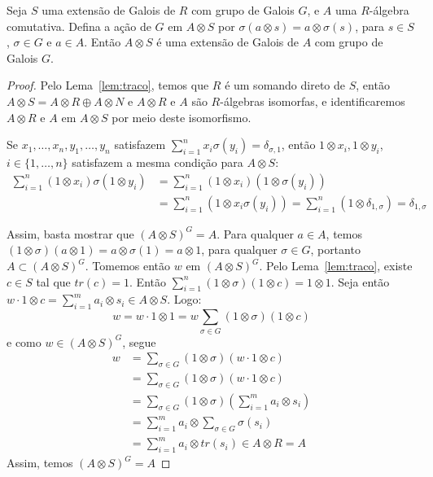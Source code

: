\begin{lemma} \label{lem:alg}
Seja $S$ uma extensão de Galois de $R$ com grupo de Galois $G$, e $A$ uma $R$-álgebra comutativa. Defina a ação de $G$ em $A \otimes S$ por $\sigma(a\otimes s) = a\otimes \sigma(s)$, para $s \in S$, $\sigma \in G$ e $a \in A$. Então $A \otimes S$ é uma extensão de Galois de $A$ com grupo de Galois $G$.
\begin{proof}
Pelo Lema~\ref{lem:traco}, temos que $R$ é um somando direto de $S$, então $A\otimes S= A\otimes R \oplus A\otimes N$ e $A\otimes R$ e $A$ são $R$-álgebras isomorfas, e identificaremos $A\otimes R$ e $A$ em $A\otimes S$ por meio deste isomorfismo. \par Se $x_1, \dots, x_n, y_1, \dots, y_n$ satisfazem $\sum_{i=1}^{n}x_i\sigma(y_i) = \delta_{\sigma,1}$, então $1\otimes x_i, 1\otimes y_i$, $i\in \{1,\dots, n\}$ satisfazem a mesma condição para $A\otimes S$:
\begin{align*}
        \sum_{i=1}^{n}(1\otimes x_i)\sigma(1\otimes y_i) &= \sum_{i=1}^{n}(1\otimes x_i)\left(1\otimes \sigma(y_i)\right) \\
        &= \sum_{i=1}^{n} \left(1\otimes x_i \sigma(y_i) \right) = \sum_{i=1}^{n}\left( 1\otimes \delta_{1, \sigma} \right) = \delta_{1, \sigma}
\end{align*} \par
Assim, basta mostrar que $\left(A\otimes S\right)^G=A$. Para qualquer $a \in A$, temos $(1\otimes \sigma)(a\otimes 1)= a\otimes \sigma(1) = a\otimes 1$, para qualquer $\sigma \in G$, portanto $A \subset (A\otimes S)^G$. Tomemos então $w$ em $(A \otimes S)^G$. Pelo Lema~\ref{lem:traco}, existe $c \in S$ tal que $tr(c)=1$. Então $\sum_{i=1}^{n} (1\otimes \sigma)(1\otimes c) = 1 \otimes 1$. Seja então $w\cdot 1\otimes c = \sum_{i=1}^{m} a_i \otimes s_i \in A\otimes S$. Logo:
\[w = w\cdot 1\otimes 1 = w\sum_{\sigma \in G} (1 \otimes \sigma)(1 \otimes c)\]
e como $w\in (A\otimes S)^G$, segue
\begin{align*}
    w &= \sum_{\sigma\in G} (1\otimes \sigma)(w\cdot 1 \otimes c) \\
    &= \sum_{\sigma \in G} (1 \otimes \sigma)(w \cdot 1 \otimes c) \\
    &= \sum_{\sigma\in G}(1\otimes \sigma)\left( \sum_{i=1}^{m} a_i\otimes s_i \right) \\
    &= \sum_{i=1}^{m} a_i \otimes \sum_{\sigma\in G} \sigma(s_i) \\
    &= \sum_{i=1}^{m} a_i \otimes tr(s_i) \in A\otimes R = A
\end{align*}
Assim, temos $\left(A\otimes S\right)^G = A$
\end{proof}
\end{lemma}

